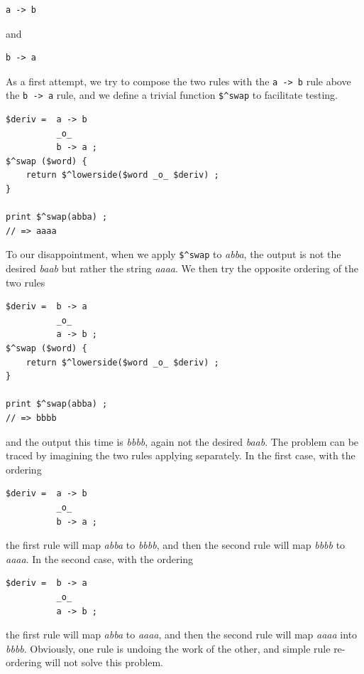 \begin{Verbatim}
a -> b 
\end{Verbatim}

\noindent
and

\begin{Verbatim}
b -> a
\end{Verbatim}

As a first attempt, we try to compose the two rules with the \verb!a -> b! rule above the
\verb!b -> a! rule, and we define a trivial function \verb!$^swap! to facilitate testing.


\begin{Verbatim}
$deriv =  a -> b
          _o_
          b -> a ;
$^swap ($word) { 
    return $^lowerside($word _o_ $deriv) ;
}

print $^swap(abba) ;
// => aaaa
\end{Verbatim}

\noindent
To our disappointment, when we apply \verb!$^swap! to \emph{abba}, the output is not the desired
\emph{baab} but rather the string \emph{aaaa}.  We then try the opposite ordering of the
two rules

\begin{Verbatim}
$deriv =  b -> a
          _o_
          a -> b ;
$^swap ($word) { 
    return $^lowerside($word _o_ $deriv) ;
}

print $^swap(abba) ;
// => bbbb
\end{Verbatim}

\noindent
and the output this time is \emph{bbbb}, again not the desired \emph{baab}.  The problem
can be traced by imagining the two rules applying separately.  In the first case, with the
ordering


\begin{Verbatim}
$deriv =  a -> b
          _o_
          b -> a ;
\end{Verbatim}

\noindent
the first rule will map \emph{abba} to \emph{bbbb}, and then the second rule will map
\emph{bbbb} to \emph{aaaa}.  In the second case, with the ordering


\begin{Verbatim}
$deriv =  b -> a
          _o_
          a -> b ;
\end{Verbatim}

\noindent
the first rule will map \emph{abba} to \emph{aaaa}, and then the second rule will map
\emph{aaaa} into \emph{bbbb}.  Obviously, one rule is undoing the work
of the other, and simple rule re-ordering will not solve this
problem.

